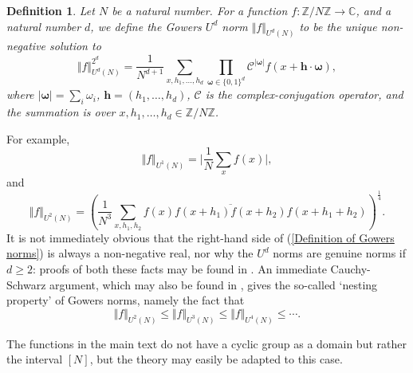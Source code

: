 \documentclass[12pt,a4paper,twoside,reqno]{amsart}
\newtheorem{Definition}[Theorem]{Definition}
\numberwithin{equation}{section}
\begin{document}
\begin{Definition}
\label{Definition of Gowers norms over cyclic groups}
Let $N$ be a natural number. For a function $f:\mathbb{Z}/N\mathbb{Z}\longrightarrow \mathbb{C}$, and a natural number $d$, we define the Gowers $U^{d}$ norm $\Vert f\Vert_{U^{d}(N)}$ to be the unique non-negative solution to 
\begin{equation}
\label{Definition of Gowers norms}
\Vert f\Vert_{U^{d}(N)}^{2^d} = \frac{1}{N^{d+1}}\sum\limits_{x,h_1,\dots,h_d}\prod\limits_{\boldsymbol{\omega}\in \{0,1\}^d}\mathcal{C}^{\vert \boldsymbol{\omega} \vert} f(x+\mathbf{h}\cdot\boldsymbol{\omega}),
\end{equation}
\noindent where $\vert \boldsymbol{\omega}\vert = \sum\limits_i \omega_i$, $\mathbf{h} = (h_1,\dots,h_d)$, $\mathcal{C}$ is the complex-conjugation operator, and the summation is over $x,h_1,\dots,h_d\in \mathbb{Z}/N\mathbb{Z}$.
\end{Definition}
\noindent For example, $$\Vert f\Vert_{U^1(N)} = \Big\vert\frac{1}{N}\sum\limits_{x} f(x)\Big\vert,$$ and $$\Vert f\Vert_{U^2(N)} = \left(\frac{1}{N^3}\sum\limits_{x,h_1,h_2}  f(x)\overline{f(x+h_1)f(x+h_2)}f(x+h_1+h_2)\right)^{\frac{1}{4}}.$$ It is not immediately obvious that the right-hand side of  (\ref{Definition of Gowers norms}) is always a non-negative real, nor why the $U^d$ norms are genuine norms if $d\geqslant 2$: proofs of both these facts may be found in \cite{TaVu06}. An immediate Cauchy-Schwarz argument, which may also be found in \cite{TaVu06}, gives the so-called `nesting property' of Gowers norms, namely the fact that \[ \Vert f\Vert_{U^2(N)} \leqslant \Vert f\Vert_{U^3(N)} \leqslant \Vert f\Vert_{U^4(N)} \leqslant \cdots. \]

The functions in the main text do not have a cyclic group as a domain but rather the interval $[N]$, but the theory may easily be adapted to this case. 
\end{document}
